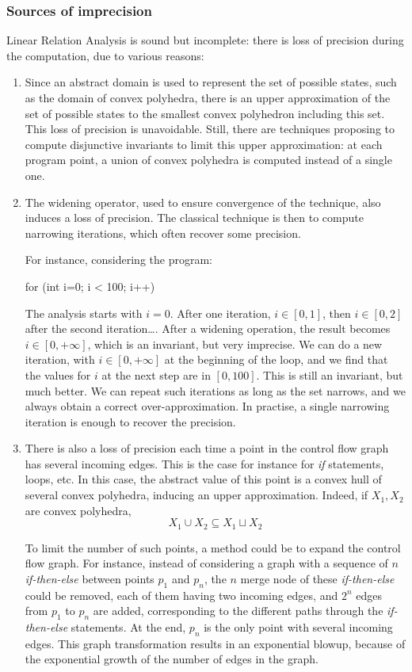 \documentclass[a4paper,english,titlepage,11pt]{report}
\begin{document}
\subsubsection{Sources of imprecision}
 \label{imprecision}
Linear Relation Analysis is sound but incomplete: there is loss of precision
during the computation, due to various reasons:
\begin{enumerate}
\item Since an abstract domain is used to represent the set of possible states,
such as the domain of convex polyhedra, there is an upper approximation of the
set of possible states to the smallest convex polyhedron including this set. This
loss of precision is unavoidable. Still, there are techniques proposing to
compute disjunctive invariants \cite{GulwaniZ10} to limit this upper approximation: at each
program point, a union of convex polyhedra is computed instead of a single
one.
\item The widening operator, used to ensure convergence of the technique,
also induces a loss of precision. The classical technique is then to compute
narrowing iterations, which often recover some precision. 

For instance, considering the program:
\begin{C}
for (int i=0; i < 100; i++) {
}
\end{C}
The analysis starts with $i=0$. After one iteration, $i \in
[0,1]$, then $i\in [0,2]$ after the second iteration\dots. 
After a widening operation, the result becomes $i \in [0,
+\infty]$, which is an invariant, but very imprecise. We can do a new iteration,
with $i\in [0, +\infty]$ at the beginning of the loop, and we find that the
values for $i$ at the next step are in $[0, 100]$. This is still an invariant,
but much better. We can repeat such iterations as long as the set narrows, and
we always obtain a correct over-approximation.
In practise, a single narrowing iteration is enough to recover the precision.

\item There is also a loss of precision each time a point in the control flow
graph has several incoming edges. This is the case for instance for
\emph{if} statements, loops, etc. In this case, the abstract value of this point
is a convex hull of several convex polyhedra, inducing an upper approximation.
Indeed, if $X_1, X_2$ are convex polyhedra,
$$X_1 \cup X_2 \subseteq X_1 \sqcup X_2$$

To limit the number of such points, a method could be
to expand the control flow graph. For instance, instead of considering a graph
with a sequence of $n$ \emph{if-then-else} between points $p_1$ and $p_n$, 
the $n$ merge node
of these \emph{if-then-else} could be removed, each of them having two incoming
edges, and 
$2^n$ edges from $p_1$ to $p_n$ are added, corresponding to the different paths through
the \emph{if-then-else} statements. At the end, $p_n$ is the only point with
several incoming edges. This graph transformation results in an exponential
blowup, because of the exponential growth of the number of edges in the graph.
\end{enumerate}
\end{document}
